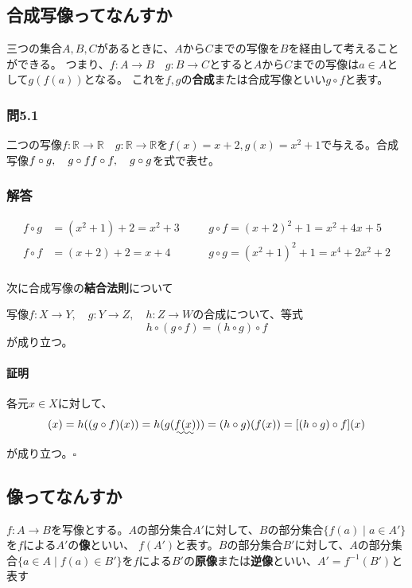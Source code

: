 \documentclass[a4j,dvipdfmx]{jsarticle}
\begin{document}
\subsection{合成写像ってなんすか}
三つの集合$A,B,C$があるときに、$A$から$C$までの写像を$B$を経由して考えることができる。
つまり、$f:A\to B\quad g:B\to C$とすると$A$から$C$までの写像は$a\in A$として$g(f(a))$となる。
これを$f,g$の\textbf{合成}または$\textbf{合成写像}$といい$g\circ f$と表す。

\subsubsection*{問5.1}
二つの写像$f:\mathbb{R}\to\mathbb{R}\quad g:\mathbb{R}\to\mathbb{R}$を$f(x)=x+2,g(x)=x^2+1$で与える。合成写像$f\circ g,\quad g\circ f\\f\circ f,\quad g\circ g$を式で表せ。
\vspace{30mm}

\subsubsection*{解答}
\color{red}
\begin{align*}
    f\circ g&=(x^2+1)+2=x^2+3\quad && g\circ f=(x+2)^2+1=x^2+4x+5\\
    f\circ f&=(x+2)+2=x+4\quad && g\circ g=(x^2+1)^2+1=x^4+2x^2+2\\
\end{align*}
\color{black}

次に合成写像の\textbf{結合法則}について
\begin{screen}
    写像$f:X\to Y,\quad g:Y\to Z,\quad h:Z\to W$の合成について、等式
    \begin{equation*}
        h\circ (g\circ f)=(h\circ g)\circ f
    \end{equation*}
    が成り立つ。
\end{screen}
\paragraph{証明}
各元$x\in X$に対して、
\begin{equation*}
    [h\circ (g\circ f)](x)=h((g\circ f)(x))=h(g(\uwave{f(x)}))=(h\circ g)(f(x))=[(h\circ g)\circ f](x)   
\end{equation*}
が成り立つ。$\square$\\ 
\newpage
\subsection{像ってなんすか}
$f:A\to B$を写像とする。$A$の部分集合$A'$に対して、$B$の部分集合$\{f(a)\mid a\in A'\}$を$f$による$A'$の\textbf{像}といい、
$f(A')$と表す。$B$の部分集合$B'$に対して、$A$の部分集合$\{a\in A \mid f(a)\in B'\}$を$f$による$B'$の\textbf{原像}または\textbf{逆像}といい、$A'=f^{-1}(B')$と表す
\end{document}
